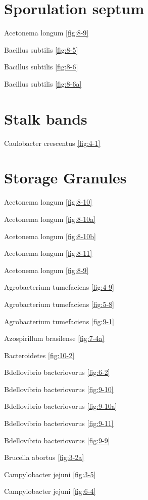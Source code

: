 \documentclass[]{tufte-book}
\begin{document}
\section*{Sporulation septum}\label{sporulation-septum}

Acetonema longum \ref{fig:8-9}

Bacillus subtilis \ref{fig:8-5}

Bacillus subtilis \ref{fig:8-6}

Bacillus subtilis \ref{fig:8-6a}

\section*{Stalk bands}\label{stalk-bands}

Caulobacter crescentus \ref{fig:4-1}

\section*{Storage Granules}\label{storage-granules}

Acetonema longum \ref{fig:8-10}

Acetonema longum \ref{fig:8-10a}

Acetonema longum \ref{fig:8-10b}

Acetonema longum \ref{fig:8-11}

Acetonema longum \ref{fig:8-9}

Agrobacterium tumefaciens \ref{fig:4-9}

Agrobacterium tumefaciens \ref{fig:5-8}

Agrobacterium tumefaciens \ref{fig:9-1}

Azospirillum brasilense \ref{fig:7-4a}

Bacteroidetes \ref{fig:10-2}

Bdellovibrio bacteriovorus \ref{fig:6-2}

Bdellovibrio bacteriovorus \ref{fig:9-10}

Bdellovibrio bacteriovorus \ref{fig:9-10a}

Bdellovibrio bacteriovorus \ref{fig:9-11}

Bdellovibrio bacteriovorus \ref{fig:9-9}

Brucella abortus \ref{fig:3-2a}

Campylobacter jejuni \ref{fig:3-5}

Campylobacter jejuni \ref{fig:6-4}
\end{document}
